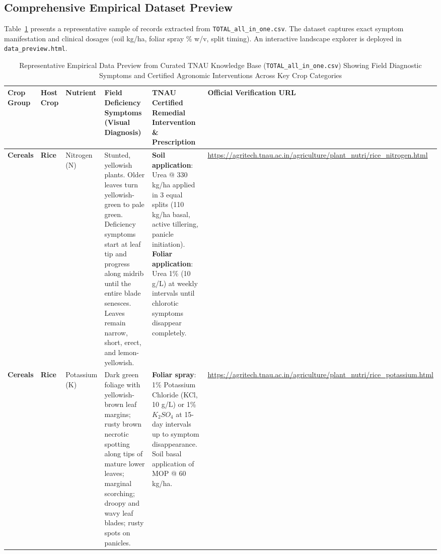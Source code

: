 \documentclass[9pt,twocolumn,a4paper,landscape]{article}
\begin{document}
\subsection{Comprehensive Empirical Dataset Preview}
Table~\ref{tab:data_preview} presents a representative sample of records extracted from \texttt{TOTAL\_all\_in\_one.csv}. The dataset captures exact symptom manifestation and clinical dosages (soil kg/ha, foliar spray \% w/v, split timing). An interactive landscape explorer is deployed in \texttt{data\_preview.html}.

\begin{table}[t]
\centering
\caption{Representative Empirical Data Preview from Curated TNAU Knowledge Base (\texttt{TOTAL\_all\_in\_one.csv}) Showing Field Diagnostic Symptoms and Certified Agronomic Interventions Across Key Crop Categories}
\label{tab:data_preview}
\scriptsize
\begin{tabularx}{\textwidth}{p{1.4cm} p{1.6cm} p{1.5cm} p{6.2cm} p{8.2cm} p{3.2cm}}
\toprule
\textbf{Crop Group} & \textbf{Host Crop} & \textbf{Nutrient} & \textbf{Field Deficiency Symptoms (Visual Diagnosis)} & \textbf{TNAU Certified Remedial Intervention \& Prescription} & \textbf{Official Verification URL} \\
\midrule
\rowcolor{gray!8}
\textbf{Cereals} & \textbf{Rice} & Nitrogen (N) & Stunted, yellowish plants. Older leaves turn yellowish-green to pale green. Deficiency symptoms start at leaf tip and progress along midrib until the entire blade senesces. Leaves remain narrow, short, erect, and lemon-yellowish. & \textbf{Soil application}: Urea @ 330 kg/ha applied in 3 equal splits (110 kg/ha basal, active tillering, panicle initiation). \newline\textbf{Foliar application}: Urea 1\% (10 g/L) at weekly intervals until chlorotic symptoms disappear completely. & \url{https://agritech.tnau.ac.in/agriculture/plant_nutri/rice_nitrogen.html} \\

\textbf{Cereals} & \textbf{Rice} & Potassium (K) & Dark green foliage with yellowish-brown leaf margins; rusty brown necrotic spotting along tips of mature lower leaves; marginal scorching; droopy and wavy leaf blades; rusty spots on panicles. & \textbf{Foliar spray}: 1\% Potassium Chloride (KCl, 10 g/L) or 1\% $K_2SO_4$ at 15-day intervals up to symptom disappearance. Soil basal application of MOP @ 60 kg/ha. & \url{https://agritech.tnau.ac.in/agriculture/plant_nutri/rice_potassium.html} \\


\end{tabularx}
\end{table}
\end{document}

